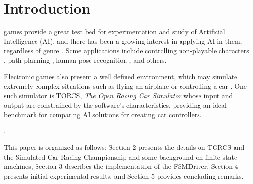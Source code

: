 \section{Introduction}
 games provide a great test bed for experimentation and 
study of Artificial Intelligence (AI), and there has been a growing interest in 
applying AI in them, regardless of genre \cite{simon2008}. Some applications 
include controlling non-playable characters \cite{stanley2005}, path planning \cite{freitas2012}, human pose recognition \cite{shotton2011}, and others. 

Electronic games also present a well defined environment, which may simulate 
extremely complex situations such as flying an airplane or controlling a car 
\cite{scr2009}. One such simulator is TORCS, \emph{The Open Racing Car Simulator}
\cite{TORCS} whose input and output are constrained by the software's characteristics, providing an ideal benchmark for comparing AI solutions for creating car controllers.

.

 This paper is organized as follows: Section 2 presents the details on TORCS and 
 the Simulated Car Racing Championship and some background on finite state machines,
 Section 3 describes the implementation of the FSMDriver, Section 4 presents 
 initial experimental results, and Section 5 provides concluding remarks.